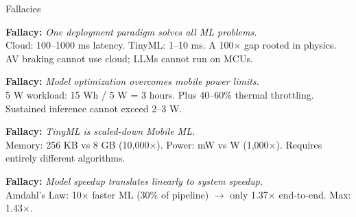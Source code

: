\documentclass[aspectratio=169, 12pt]{beamer}
\begin{document}
\begin{frame}{Fallacies}
\note{
%
%
%
}

\footnotesize
\textbf{Fallacy:} \textit{One deployment paradigm solves all ML problems.}\\
Cloud: 100--1000 ms latency. TinyML: 1--10 ms. A 100$\times$ gap rooted in physics. AV braking cannot use cloud; LLMs cannot run on MCUs.

\vspace{0.1cm}
\textbf{Fallacy:} \textit{Model optimization overcomes mobile power limits.}\\
5 W workload: 15 Wh / 5 W = 3 hours. Plus 40--60\% thermal throttling. Sustained inference cannot exceed 2--3 W.

\vspace{0.1cm}
\textbf{Fallacy:} \textit{TinyML is scaled-down Mobile ML.}\\
Memory: 256 KB vs 8 GB (10,000$\times$). Power: mW vs W (1,000$\times$). Requires entirely different algorithms.

\vspace{0.1cm}
\textbf{Fallacy:} \textit{Model speedup translates linearly to system speedup.}\\
Amdahl's Law: 10$\times$ faster ML (30\% of pipeline) $\to$ only 1.37$\times$ end-to-end. Max: 1.43$\times$.

\end{frame}
\end{document}
